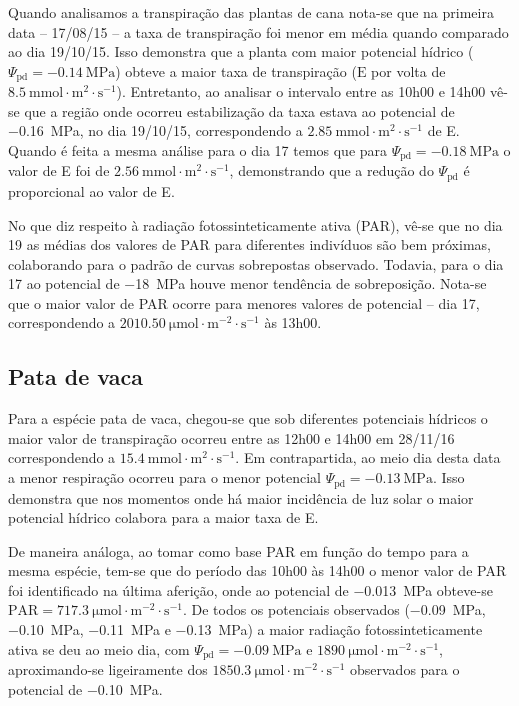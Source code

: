\documentclass[a4paper, 12pt]{article}
\numberwithin{equation}{section}
\begin{document}
	Quando analisamos a transpiração das plantas de cana nota-se que na primeira data -- 17/08/15 -- a taxa de transpiração foi menor em média quando comparado ao dia 19/10/15. Isso demonstra que a planta com maior potencial hídrico ($\Psi_{\textrm{pd}}=\SI{-0.14}{\mega\pascal}$) obteve a maior taxa de transpiração ($\textrm{E}$ por volta de $\SI{8.5}{\milli\mole\cdot\meter^{2}\cdot\second^{-1}}$). Entretanto, ao analisar o intervalo entre as 10h00 e 14h00 vê-se que a região onde ocorreu estabilização da taxa estava ao potencial de \SI{-.16}{\mega\pascal}, no dia 19/10/15, correspondendo a $\SI{2.85}{\milli\mole\cdot\meter^{2}\cdot\second^{-1}}$ de E. Quando é feita a mesma análise para o dia 17 temos que para $\Psi_{\textrm{pd}}=\SI{-0.18}{\mega\pascal}$ o valor de E foi de $\SI{2.56}{\milli\mole\cdot\meter^{2}\cdot\second^{-1}}$, demonstrando que a redução do $\Psi_{\textrm{pd}}$ é proporcional ao valor de E. 
	
	No que diz respeito à radiação fotossinteticamente ativa (PAR), vê-se que no dia 19 as médias dos valores de PAR para diferentes indivíduos são bem próximas, colaborando para o padrão de curvas sobrepostas observado. Todavia, para o dia 17 ao potencial de \SI{-18}{\mega\pascal} houve menor tendência de sobreposição. Nota-se que o maior valor de PAR ocorre para menores valores de potencial -- dia 17, correspondendo a $\SI{2010.50}{\micro\mole\cdot\meter^{-2}\cdot\second^{-1}}$ às 13h00.
	
	\subsection{Pata de vaca}
	Para a espécie pata de vaca, chegou-se que sob diferentes potenciais hídricos o maior valor de transpiração ocorreu entre as 12h00 e 14h00 em 28/11/16 correspondendo a $\SI{15.4}{\milli\mole\cdot\meter^{2}\cdot\second^{-1}}$. Em contrapartida, ao meio dia desta data a menor respiração ocorreu para o menor potencial $\Psi_{\textrm{pd}}=\SI{-0.13}{\mega\pascal}$. Isso demonstra que nos momentos onde há maior incidência de luz solar o maior potencial hídrico colabora para a maior taxa de E.
	
	De maneira análoga, ao tomar como base PAR em função do tempo para a mesma espécie, tem-se que do período das 10h00 às 14h00 o menor valor de PAR foi identificado na última aferição, onde ao potencial de \SI{-.013}{\mega\pascal} obteve-se $\textrm{PAR}=\SI{717.3}{\micro\mole\cdot\meter^{-2}\cdot\second^{-1}}$. De todos os potenciais observados (\SI{-.09}{\mega\pascal}, \SI{-.10}{\mega\pascal}, \SI{-.11}{\mega\pascal} e \SI{-.13}{\mega\pascal}) a maior radiação fotossinteticamente ativa se deu ao meio dia, com $\Psi_{\textrm{pd}}=\SI{-0.09}{\mega\pascal}$ e $\SI{1890}{\micro\mole\cdot\meter^{-2}\cdot\second^{-1}}$, aproximando-se ligeiramente dos $\SI{1850.3}{\micro\mole\cdot\meter^{-2}\cdot\second^{-1}}$ observados para o potencial de \SI{-.10}{\mega\pascal}.
	
\end{document}
